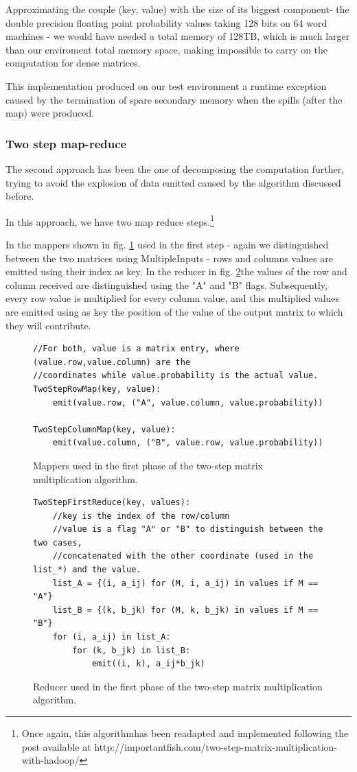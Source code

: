 Approximating the couple (key, value) with the size of its biggest component-
the double precision floating point probability values taking 128 bits on 64 word
machines - we would have needed a total memory of 128TB, which is much larger than
our enviroment total memory space, making impossible to carry on the computation
for dense matrices.

This implementation produced on our test environment a runtime exception caused by the termination
of spare secondary memory when the spills (after the map) were produced.

\subsubsection{Two step map-reduce}
The second approach has been the one of decomposing the computation further, trying to avoid
the explosion of data emitted caused by the algorithm discussed before.

In this approach, we have two map reduce steps.\footnote{Once again, this algorithmhas been readapted and implemented
following the post available at http://importantfish.com/two-step-matrix-multiplication-with-hadoop/}

In the mappers shown in fig. \ref{fig:twoStep1Map} used in the first step - again we distinguished between the two matrices using MultipleInputs - rows and columns values are emitted using their index as key.
In the reducer in fig. \ref{fig:twoStep1Reducer}the values of the row and column received are distinguished using the "A" and "B" flags. Subsequently,
every row value is multiplied for every column value, and this multiplied values are emitted using as key
the position of the value of the output matrix to which they will contribute. %
\begin{figure}[H]
\begin{verbatim}
//For both, value is a matrix entry, where (value.row,value.column) are the
//coordinates while value.probability is the actual value.
TwoStepRowMap(key, value):
    emit(value.row, ("A", value.column, value.probability))

TwoStepColumnMap(key, value):
    emit(value.column, ("B", value.row, value.probability))
\end{verbatim}
\caption{Mappers used in the first phase of the two-step matrix multiplication algorithm.}
\label{fig:twoStep1Map}
\end{figure}
\begin{figure}[H]
\begin{verbatim}
TwoStepFirstReduce(key, values):
    //key is the index of the row/column
    //value is a flag "A" or "B" to distinguish between the two cases,
    //concatenated with the other coordinate (used in the list_*) and the value. 
    list_A = {(i, a_ij) for (M, i, a_ij) in values if M == "A"}
    list_B = {(k, b_jk) for (M, k, b_jk) in values if M == "B"}
    for (i, a_ij) in list_A:
        for (k, b_jk) in list_B:
            emit((i, k), a_ij*b_jk)
\end{verbatim}
\caption{Reducer used in the first phase of the two-step matrix multiplication algorithm.}
\label{fig:twoStep1Reducer}
\end{figure}

